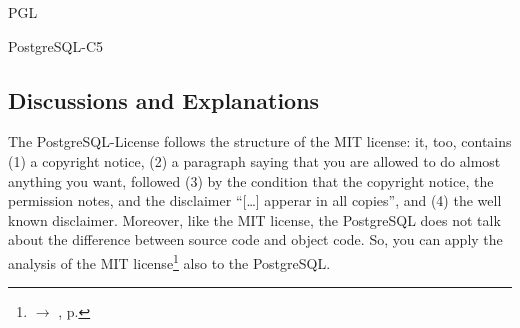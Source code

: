 \begin{license}{PGL}
\begin{lsuc}{PostgreSQL-C5}


  \begin{lsucrequires}
    \lsucmandatory{\giveLicense}
    \lsucoptional{\markModifications}
    \lsucoptional{\addToCopyrightDialog} 
    \lsucoptional{\linkToHomepage}
    \lsucoptional{\separateComponents}
  \end{lsucrequires}

  \lsucprohibitsnothing
\end{lsuc}


\subsection{Discussions and Explanations}
\label{PGLDiscussion}

The PostgreSQL-License follows the structure of the MIT license: it, too, contains 
(1) a copyright notice, 
(2) a paragraph saying that you are allowed to do almost anything you want,
    followed 
(3) by the condition that the copyright notice, the permission notes, and the
    disclaimer \enquote{[\ldots] apperar in all copies}, and 
(4) the well known disclaimer.\citePGL{}
Moreover, like the MIT license, the PostgreSQL does not talk about the
difference between source code and object code. So, you can apply the analysis
of the MIT license\footnote{$\rightarrow$ \oslic, p. \pageref{MITDiscussion}} 
also to the PostgreSQL.

\end{license}
%

